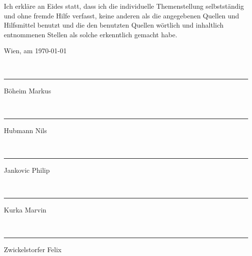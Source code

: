 
Ich erkläre an Eides statt, dass ich die individuelle Themenstellung
selbstständig und ohne fremde Hilfe verfasst, keine anderen als die
angegebenen Quellen und Hilfsmittel benutzt und die den benutzten
Quellen wörtlich und inhaltlich entnommenen Stellen als solche erkenntlich
gemacht habe.

\begin{flushleft}
\bigskip{}
Wien, am \today \\
\newcommand{\namesigdate}[2][8cm]{
\vspace{2cm}~\newline
\parbox{#1}{\hrule\centering #2\Large\strut}
\hfill
}
\namesigdate{Böheim Markus}
\namesigdate{Hubmann Nils}
\namesigdate{Jankovic Philip}
\namesigdate{Kurka Marvin}
\namesigdate{Zwickelstorfer Felix}
\par\end{flushleft}

